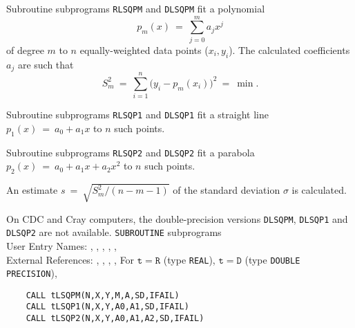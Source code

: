             
              
\Submitter{}                
Subroutine subprograms {\tt RLSQPM} and {\tt DLSQPM} fit a polynomial
$$p_m(x) \ = \ \sum_{j=0}^m a_jx^j$$
of degree $m$ to $n$ equally-weighted data points ($x_i,y_i$).
The calculated coefficients $a_j$ are such that
$$S_m^2 \ = \ \sum_{i=1}^n \big(y_i-p_m(x_i)\big)^2 \ = \ \min.$$
\par
Subroutine subprograms {\tt RLSQP1} and {\tt DLSQP1} fit a straight
line $p_1(x) \ = \ a_0+a_1x$ to $n$ such points.
\par
Subroutine subprograms {\tt RLSQP2} and {\tt DLSQP2} fit a parabola
$p_2(x) \ = \ a_0+a_1x+a_2x^2$ to $n$ such points.
\par
An estimate $s \ = \ \sqrt{S_m^2/(n-m-1)}$
of the standard deviation $\sigma$ is calculated.
\par
On CDC and Cray computers, the double-precision
versions {\tt DLSQPM}, {\tt DLSQP1} and {\tt DLSQP2} are not available.
\Structure
{\tt SUBROUTINE} subprograms \\
User Entry Names: , , ,
                  , ,  \\
External References:
, , , ,
\Usage
For $\mathtt{t=R}$ (type {\tt REAL}), $\mathtt{t=D}$ (type
{\tt DOUBLE PRECISION}),
\begin{verbatim}
    CALL tLSQPM(N,X,Y,M,A,SD,IFAIL)
    CALL tLSQP1(N,X,Y,A0,A1,SD,IFAIL)
    CALL tLSQP2(N,X,Y,A0,A1,A2,SD,IFAIL)
\end{verbatim}
